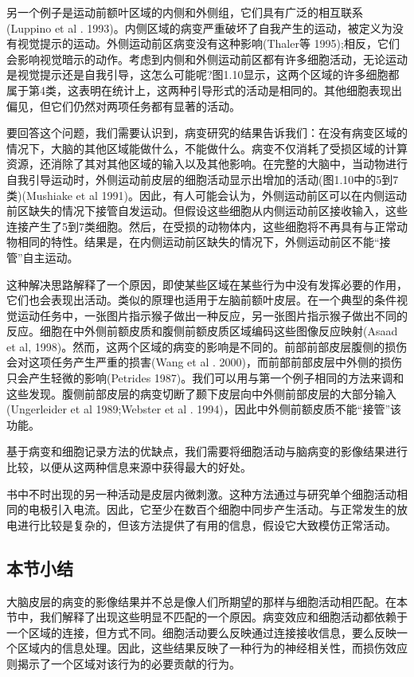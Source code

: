 \par
另一个例子是运动前额叶区域的内侧和外侧组，它们具有广泛的相互联系(Luppino et al . 1993)。内侧区域的病变严重破坏了自我产生的运动，被定义为没有视觉提示的运动。外侧运动前区病变没有这种影响(Thaler等 1995);相反，它们会影响视觉暗示的动作。考虑到内侧和外侧运动前区都有许多细胞活动，无论运动是视觉提示还是自我引导，这怎么可能呢?图1.10显示，这两个区域的许多细胞都属于第4类，这表明在统计上，这两种引导形式的活动是相同的。其他细胞表现出偏见，但它们仍然对两项任务都有显著的活动。

\par
要回答这个问题，我们需要认识到，病变研究的结果告诉我们：在没有病变区域的情况下，大脑的其他区域能做什么，不能做什么。病变不仅消耗了受损区域的计算资源，还消除了其对其他区域的输入以及其他影响。在完整的大脑中，当动物进行自我引导运动时，外侧运动前皮层的细胞活动显示出增加的活动(图1.10中的5到7类)(Mushiake et al 1991)。因此，有人可能会认为，外侧运动前区可以在内侧运动前区缺失的情况下接管自发运动。但假设这些细胞从内侧运动前区接收输入，这些连接产生了5到7类细胞。然后，在受损的动物体内，这些细胞将不再具有与正常动物相同的特性。结果是，在内侧运动前区缺失的情况下，外侧运动前区不能“接管”自主运动。

\par
这种解决思路解释了一个原因，即使某些区域在某些行为中没有发挥必要的作用，它们也会表现出活动。类似的原理也适用于左脑前额叶皮层。在一个典型的条件视觉运动任务中，一张图片指示猴子做出一种反应，另一张图片指示猴子做出不同的反应。细胞在中外侧前额皮质和腹侧前额皮质区域编码这些图像反应映射(Asaad et al, 1998)。然而，这两个区域的病变的影响是不同的。前部前部皮层腹侧的损伤会对这项任务产生严重的损害(Wang et al . 2000)，而前部前部皮层中外侧的损伤只会产生轻微的影响(Petrides 1987)。我们可以用与第一个例子相同的方法来调和这些发现。腹侧前部皮层的病变切断了颞下皮层向中外侧前部皮层的大部分输入(Ungerleider et al 1989;Webster et al . 1994)，因此中外侧前额皮质不能“接管”该功能。

\par
基于病变和细胞记录方法的优缺点，我们需要将细胞活动与脑病变的影像结果进行比较，以便从这两种信息来源中获得最大的好处。
\par
书中不时出现的另一种活动是皮层内微刺激。这种方法通过与研究单个细胞活动相同的电极引入电流。因此，它至少在数百个细胞中同步产生活动。与正常发生的放电进行比较是复杂的，但该方法提供了有用的信息，假设它大致模仿正常活动。
\subsection{本节小结}
大脑皮层的病变的影像结果并不总是像人们所期望的那样与细胞活动相匹配。在本节中，我们解释了出现这些明显不匹配的一个原因。病变效应和细胞活动都依赖于一个区域的连接，但方式不同。细胞活动要么反映通过连接接收信息，要么反映一个区域内的信息处理。因此，这些结果反映了一种行为的神经相关性，而损伤效应则揭示了一个区域对该行为的必要贡献的行为。

